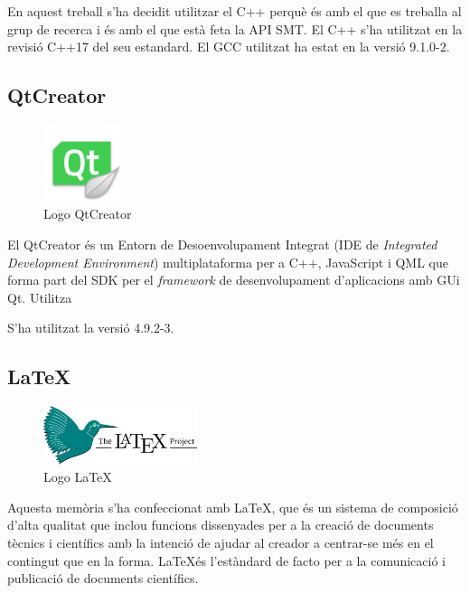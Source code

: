 \documentclass[11pt,a4paper,twoside]{report}
\begin{document}
  En aquest treball s'ha decidit utilitzar el C++ perquè és amb el que es treballa al grup de recerca i és amb el que està feta la API SMT. El C++ s'ha utilitzat en la revisió C++17 del seu estandard. El GCC utilitzat ha estat en la versió 9.1.0-2. 

  \subsection{QtCreator}

  \begin{figure}[ht!]
    \centering
    \includegraphics[width=0.2\textwidth]{Diagrames/qtc.png}
    \caption{Logo QtCreator}
    \label{fig:qtc}
  \end{figure}

  El QtCreator és un Entorn de Desoenvolupament Integrat (IDE de \textit{Integrated Development Environment}) multiplataforma per a C++, 
  JavaScript i QML que forma part del SDK per el \textit{framework} de desenvolupament d'aplicacions amb GUi Qt. Utilitza 

  S'ha utilitzat la versió 4.9.2-3.

  \subsection{\LaTeX}
  \begin{figure}[ht!]
    \centering
    \includegraphics[width=0.4\textwidth]{Diagrames/latex.png}
    \caption{Logo \LaTeX}
    \label{fig:latex}
  \end{figure}
  

  Aquesta memòria s'ha confeccionat amb \LaTeX, que és un sistema de composició d'alta qualitat que inclou funcions dissenyades per a la creació de documents tècnics i científics amb la intenció de ajudar al creador a centrar-se més en el contingut que en la forma.
\LaTeX és l'estàndard de facto per a la comunicació i publicació de documents científics. 
\end{document}

